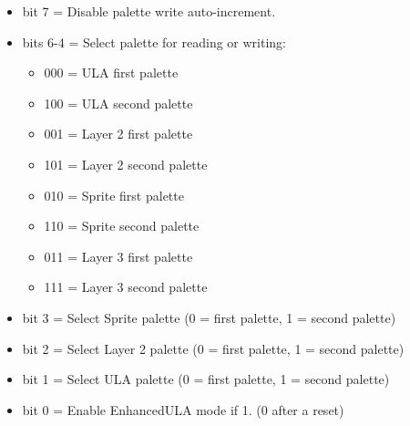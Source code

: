 \begin{itemize}
\item bit 7 = Disable palette write auto-increment.
\item bits 6-4 = Select palette for reading or writing:
  \begin{itemize}
  \item 000 = ULA first palette
  \item 100 = ULA second palette
  \item 001 = Layer 2 first palette
  \item 101 = Layer 2 second palette
  \item 010 = Sprite first palette
  \item 110 = Sprite second palette
  \item 011 = Layer 3 first palette
  \item 111 = Layer 3 second palette
  \end{itemize}
\item bit 3 = Select Sprite palette (0 = first palette, 1 = second
  palette)
\item bit 2 = Select Layer 2 palette (0 = first palette, 1 = second
  palette)
\item bit 1 = Select ULA palette (0 = first palette, 1 = second
  palette)
\item bit 0 = Enable EnhancedULA mode if 1. (0 after a reset)
\end{itemize}

